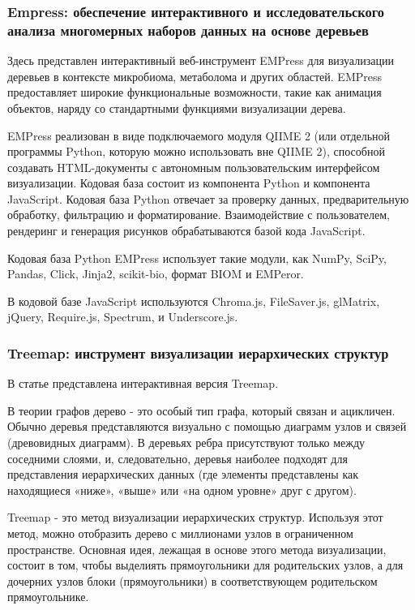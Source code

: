 \subsubsection{Empress: обеспечение интерактивного и исследовательского анализа многомерных наборов данных на основе деревьев \cite{Cantrell2021}}

Здесь представлен интерактивный веб-инструмент EMPress для визуализации деревьев в контексте микробиома, метаболома и других областей. EMPress предоставляет широкие функциональные возможности, такие как анимация объектов, наряду со стандартными функциями визуализации дерева.

EMPress реализован в виде подключаемого модуля QIIME 2 (или отдельной программы Python, которую можно использовать вне QIIME 2), способной создавать HTML-документы с автономным пользовательским интерфейсом визуализации. Кодовая база состоит из компонента Python и компонента JavaScript. Кодовая база Python отвечает за проверку данных, предварительную обработку, фильтрацию и форматирование. Взаимодействие с пользователем, рендеринг и генерация рисунков обрабатываются базой кода JavaScript. 

Кодовая база Python EMPress использует такие модули, как NumPy, SciPy, Pandas, Click, Jinja2, scikit-bio, формат BIOM и EMPeror. 

В кодовой базе JavaScript используются Chroma.js, FileSaver.js, glMatrix, jQuery, Require.js, Spectrum, и Underscore.js. 

\subsubsection{Treemap: инструмент визуализации иерархических структур \cite{Jadeja2020}}

В статье представлена интерактивная версия Treemap.

В теории графов дерево - это особый тип графа, который связан и ацикличен. Обычно деревья представляются визуально с помощью диаграмм узлов и связей (древовидных диаграмм). В деревьях ребра присутствуют только между соседними слоями, и, следовательно, деревья наиболее подходят для представления иерархических данных (где элементы представлены как находящиеся «ниже», «выше» или «на одном уровне» друг с другом).

Treemap - это метод визуализации иерархических структур. Используя этот метод, можно отобразить дерево с миллионами узлов в ограниченном пространстве. Основная идея, лежащая в основе этого метода визуализации, состоит в том, чтобы выделиять прямоугольники для родительских узлов, а для дочерних узлов блоки (прямоугольники) в соответствующем родительском прямоугольнике. 

